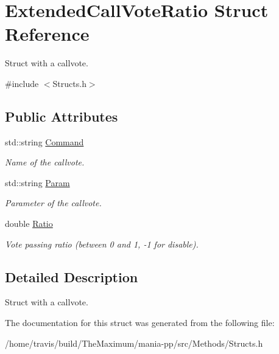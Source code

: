 \hypertarget{structExtendedCallVoteRatio}{\section{Extended\-Call\-Vote\-Ratio Struct Reference}
\label{structExtendedCallVoteRatio}
}


Struct with a callvote.  




{\ttfamily \#include $<$Structs.\-h$>$}

\subsection*{Public Attributes}
\begin{DoxyCompactItemize}
\item 
\hypertarget{structExtendedCallVoteRatio_a8b25c752447c968f2522c2748077b096}{std\-::string \hyperlink{structExtendedCallVoteRatio_a8b25c752447c968f2522c2748077b096}{Command}}\label{structExtendedCallVoteRatio_a8b25c752447c968f2522c2748077b096}

\begin{DoxyCompactList}\small\item\em Name of the callvote. \end{DoxyCompactList}\item 
\hypertarget{structExtendedCallVoteRatio_a2ed6da614783ad4f7e1f4376cc8b3b5a}{std\-::string \hyperlink{structExtendedCallVoteRatio_a2ed6da614783ad4f7e1f4376cc8b3b5a}{Param}}\label{structExtendedCallVoteRatio_a2ed6da614783ad4f7e1f4376cc8b3b5a}

\begin{DoxyCompactList}\small\item\em Parameter of the callvote. \end{DoxyCompactList}\item 
\hypertarget{structExtendedCallVoteRatio_a45f34354daff068af647554ada33f7f8}{double \hyperlink{structExtendedCallVoteRatio_a45f34354daff068af647554ada33f7f8}{Ratio}}\label{structExtendedCallVoteRatio_a45f34354daff068af647554ada33f7f8}

\begin{DoxyCompactList}\small\item\em Vote passing ratio (between 0 and 1, -\/1 for disable). \end{DoxyCompactList}\end{DoxyCompactItemize}


\subsection{Detailed Description}
Struct with a callvote. 

The documentation for this struct was generated from the following file\-:\begin{DoxyCompactItemize}
\item 
/home/travis/build/\-The\-Maximum/mania-\/pp/src/\-Methods/Structs.\-h\end{DoxyCompactItemize}
